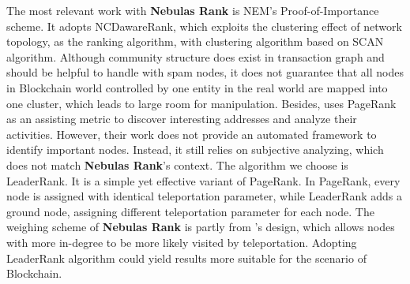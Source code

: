 The most relevant work with \textbf{Nebulas Rank} is NEM\cite{nem}'s Proof-of-Importance scheme. It adopts NCDawareRank\cite{Nikolakopoulos2013}, which exploits the clustering effect of network topology, as the ranking algorithm, with clustering algorithm based on SCAN algorithm\cite{xu2007scan}\cite{shiokawa2015scan}\cite{chang2017mathsf}. Although community structure does exist in transaction graph and should be helpful to handle with spam nodes, it does not guarantee that all nodes in Blockchain world controlled by one entity in the real world are mapped into one cluster, which leads to large room for manipulation. Besides, \textcite{Fleder2015} uses PageRank\cite{Brin2010}\cite{page1999pagerank} as an assisting metric to discover interesting addresses and analyze their activities. However, their work does not provide an automated framework to identify important nodes. Instead, it still relies on subjective analyzing, which does not match \textbf{Nebulas Rank}'s context. The algorithm we choose is LeaderRank\cite{Chen2013}\cite{Li2014}. It is a simple yet effective variant of PageRank\cite{Brin2010}\cite{page1999pagerank}. In PageRank, every node is assigned with identical teleportation parameter, while LeaderRank adds a ground node, assigning different teleportation parameter for each node. The weighing scheme of \textbf{Nebulas Rank} is partly from \textcite{Li2014}'s design, which allows nodes with more in-degree to be more likely visited by teleportation. Adopting LeaderRank algorithm could yield results more suitable for the scenario of Blockchain.

